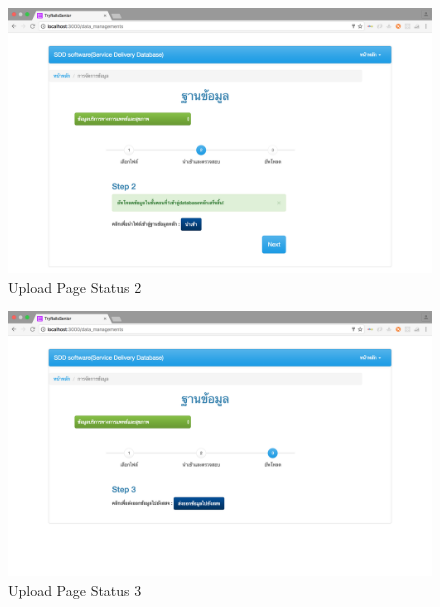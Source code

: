            \FloatBarrier
                \begin{figure}[h!]
                    \centering
                        \includegraphics[width=12cm]{images/chapter-01/mockup_rails/upload2.png}
                    	\caption{Upload Page Status 2}
                    	\label{upload2}
                \end{figure}
            \FloatBarrier
            
            \FloatBarrier
                \begin{figure}[h!]
                    \centering
                        \includegraphics[width=12cm]{images/chapter-01/mockup_rails/upload3.png}
                    	\caption{Upload Page Status 3}
                    	\label{upload3}
                \end{figure}
            \FloatBarrier
            
